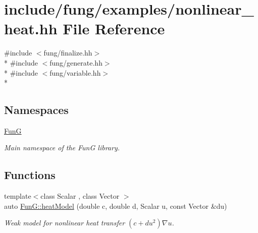 \hypertarget{nonlinear__heat_8hh}{}\section{include/fung/examples/nonlinear\+\_\+heat.hh File Reference}
\label{nonlinear__heat_8hh}
{\ttfamily \#include $<$fung/finalize.\+hh$>$}\\*
{\ttfamily \#include $<$fung/generate.\+hh$>$}\\*
{\ttfamily \#include $<$fung/variable.\+hh$>$}\\*
\subsection*{Namespaces}
\begin{DoxyCompactItemize}
\item 
 \hyperlink{namespaceFunG}{FunG}
\begin{DoxyCompactList}\small\item\em Main namespace of the FunG library. \end{DoxyCompactList}\end{DoxyCompactItemize}
\subsection*{Functions}
\begin{DoxyCompactItemize}
\item 
{\footnotesize template$<$class Scalar , class Vector $>$ }\\auto \hyperlink{namespaceFunG_aab17a1468e61f58564333b3fcd7900d6}{Fun\+G\+::heat\+Model} (double c, double d, Scalar u, const Vector \&du)
\begin{DoxyCompactList}\small\item\em Weak model for nonlinear heat transfer $ (c+du^2)\nabla u $. \end{DoxyCompactList}\end{DoxyCompactItemize}
